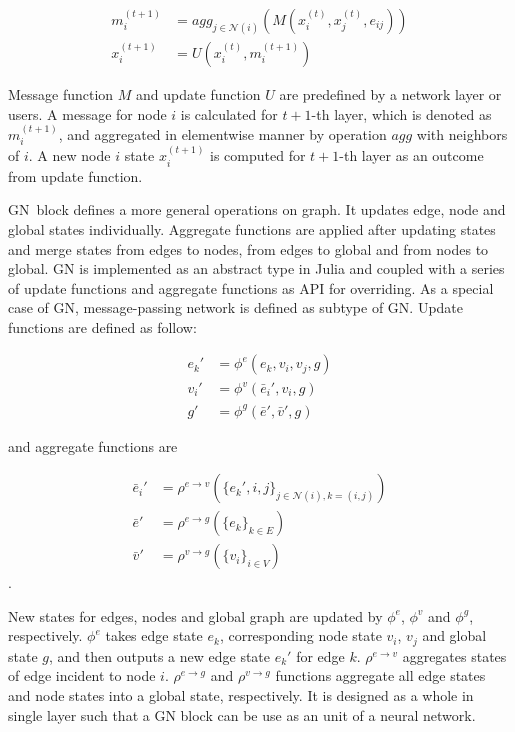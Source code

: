 \documentclass{juliacon}
\begin{document}
\[
    \begin{aligned}
    m_i^{(t+1)} &= agg_{j \in \mathcal{N}(i)}(M(x_i^{(t)}, x_j^{(t)}, e_{ij})) \\
    x_i^{(t+1)} &= U(x_i^{(t)}, m_i^{(t+1)})
    \end{aligned}
\]

Message function $M$ and update function $U$ are predefined by a network layer or users.
A message for node $i$ is calculated for $t+1$-th layer, which is denoted as $m_i^{(t+1)}$,
and aggregated in elementwise manner by operation $agg$ with neighbors of $i$. A new node $i$
state $x_i^{(t+1)}$ is computed for $t+1$-th layer as an outcome from update function.

GN block defines a more general operations on graph. It updates edge, node and global states
individually. Aggregate functions are applied after updating states and merge states from edges
to nodes, from edges to global and from nodes to global. GN is implemented as an abstract
type in Julia and coupled with a series of update functions and aggregate functions as API
for overriding. As a special case of GN, message-passing network is defined as subtype of GN.
Update functions are defined as follow:

\[
    \begin{aligned}
    e_k' &= \phi^e (e_k, v_i, v_j, g) \\
    v_i' &= \phi^v (\bar{e}_i', v_i, g) \\
    g' &= \phi^g (\bar{e}', \bar{v}', g)
    \end{aligned}
\]

and aggregate functions are

\[
    \begin{aligned}
    \bar{e}_i' &= \rho^{e \rightarrow v} (\{e_k', i, j\}_{j \in \mathcal{N}(i),k = (i, j)}) \\
    \bar{e}' &= \rho^{e \rightarrow g} (\{e_k\}_{k \in E}) \\
    \bar{v}' &= \rho^{v \rightarrow g} (\{v_i\}_{i \in V})
    \end{aligned}
\].

New states for edges, nodes and global graph are updated by $\phi^e$, $\phi^v$ and $\phi^g$,
respectively. $\phi^e$ takes edge state $e_k$, corresponding node state $v_i$, $v_j$ and
global state $g$, and then outputs a new edge state $e_k'$ for edge $k$.
$\rho^{e \rightarrow v}$ aggregates states of edge incident to node $i$.
$\rho^{e \rightarrow g}$ and $\rho^{v \rightarrow g}$ functions aggregate all edge states and
node states into a global state, respectively. It is designed as a whole in single layer
such that a GN block can be use as an unit of a neural network.
\end{document}
